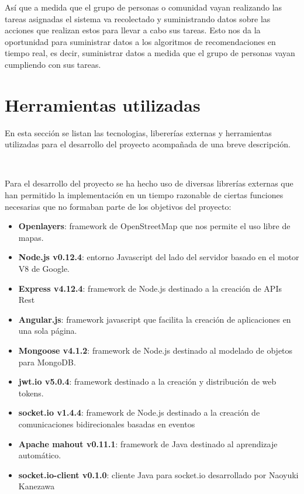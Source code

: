 Así que a medida que el grupo de personas o comunidad vayan realizando las tareas asignadas el sistema va recolectado y suministrando datos sobre las acciones que realizan estos para llevar a cabo sus tareas. Esto nos da la oportunidad para suministrar datos a los algoritmos de recomendaciones en tiempo real, es decir, suministrar datos a medida que el grupo de personas vayan cumpliendo con sus tareas.   

\section{Herramientas utilizadas}
\thispagestyle{empty}


En esta sección se listan las tecnologias, libererías externas y herramientas utilizadas para el desarrollo del proyecto acompañada de una breve descripción.

       \vspace{0.7cm}
\\
\thispagestyle{empty}

Para el desarrollo del proyecto se ha hecho uso de diversas librerías externas que han permitido la implementación en un tiempo razonable de ciertas funciones necesarias que no formaban parte de los objetivos del proyecto:

\begin{itemize}
       \item {\bfseries Openlayers}: framework de OpenStreetMap que nos permite el uso libre de mapas.
       \item {\bfseries Node.js v0.12.4}: entorno Javascript del lado del servidor basado en el motor V8 de Google. 
       \item {\bfseries Express v4.12.4}: framework de Node.js destinado a la creación de APIs Rest
       \item {\bfseries Angular.js}: framework javascript que facilita la creación de aplicaciones en una sola página. 
       \item {\bfseries Mongoose v4.1.2}: framework de Node.js destinado al modelado de objetos para MongoDB.
       \item {\bfseries jwt.io v5.0.4}: framework destinado a la creación y distribución de web tokens. 
       \item {\bfseries socket.io v1.4.4}: framework de Node.js destinado a la creación de comunicaciones bidirecionales basadas en eventos
       \item {\bfseries Apache mahout v0.11.1}: framework de Java destinado al aprendizaje automático.
       \item {\bfseries socket.io-client v0.1.0}: cliente Java para socket.io desarrollado por Naoyuki Kanezawa
\end{itemize}

